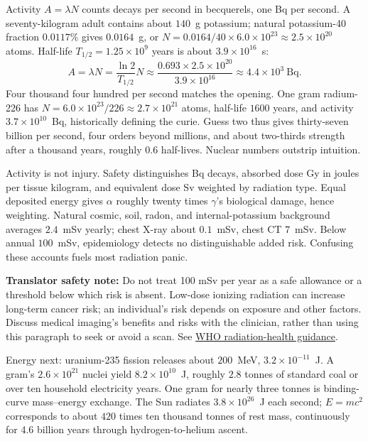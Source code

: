 Activity \(A=\lambda N\) counts decays per second in becquerels, one Bq per second. A seventy-kilogram adult contains about \(140\)~g potassium; natural potassium-40 fraction \(0.0117\%\) gives \(0.0164\)~g, or \(N=0.0164/40\times6.0\times10^{23}\approx2.5\times10^{20}\) atoms. Half-life \(T_{1/2}=1.25\times10^{9}\) years is about \(3.9\times10^{16}\)~s:
\[
A=\lambda N=\frac{\ln2}{T_{1/2}}N\approx\frac{0.693\times2.5\times10^{20}}{3.9\times10^{16}}\approx4.4\times10^{3}~\mathrm{Bq}.
\]
Four thousand four hundred per second matches the opening. One gram radium-226 has \(N=6.0\times10^{23}/226\approx2.7\times10^{21}\) atoms, half-life \(1600\) years, and activity \(3.7\times10^{10}\)~Bq, historically defining the curie. Guess two thus gives thirty-seven billion per second, four orders beyond millions, and about two-thirds strength after a thousand years, roughly 0.6 half-lives. Nuclear numbers outstrip intuition.

Activity is not injury. Safety distinguishes Bq decays, absorbed dose Gy in joules per tissue kilogram, and equivalent dose Sv weighted by radiation type. Equal deposited energy gives \(\alpha\) roughly twenty times \(\gamma\)'s biological damage, hence weighting. Natural cosmic, soil, radon, and internal-potassium background averages \(2.4\)~mSv yearly; chest X-ray about \(0.1\)~mSv, chest CT \(7\)~mSv. Below annual \(100\)~mSv, epidemiology detects no distinguishable added risk. Confusing these accounts fuels most radiation panic.

\textbf{Translator safety note:} Do not treat 100 mSv per year as a safe allowance or a threshold below which risk is absent. Low-dose ionizing radiation can increase long-term cancer risk; an individual's risk depends on exposure and other factors. Discuss medical imaging's benefits and risks with the clinician, rather than using this paragraph to seek or avoid a scan. See \href{https://www.who.int/news-room/fact-sheets/detail/ionizing-radiation-and-health-effects}{WHO radiation-health guidance}.

Energy next: uranium-235 fission releases about \(200\)~MeV, \(3.2\times10^{-11}\)~J. A gram's \(2.6\times10^{21}\) nuclei yield \(8.2\times10^{10}\)~J, roughly \(2.8\) tonnes of standard coal or over ten household electricity years. One gram for nearly three tonnes is binding-curve mass--energy exchange. The Sun radiates \(3.8\times10^{26}\)~J each second; \(E=mc^2\) corresponds to about \(420\) times ten thousand tonnes of rest mass, continuously for 4.6 billion years through hydrogen-to-helium ascent.

